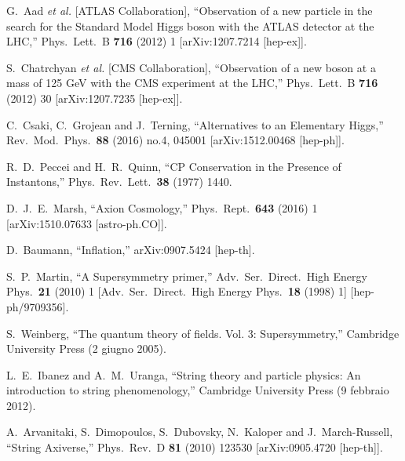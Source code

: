 \documentclass[11pt,a4paper]{article}
\begin{document}
\begin{thebibliography}{99}

  G.~Aad {\it et al.} [ATLAS Collaboration],
  ``Observation of a new particle in the search for the Standard Model Higgs boson with the ATLAS detector at the LHC,''
  Phys.\ Lett.\ B {\bf 716} (2012) 1
  [arXiv:1207.7214 [hep-ex]].
  
  S.~Chatrchyan {\it et al.} [CMS Collaboration],
  ``Observation of a new boson at a mass of 125 GeV with the CMS experiment at the LHC,''
  Phys.\ Lett.\ B {\bf 716} (2012) 30
  [arXiv:1207.7235 [hep-ex]].

  C.~Csaki, C.~Grojean and J.~Terning,
  ``Alternatives to an Elementary Higgs,''
  Rev.\ Mod.\ Phys.\  {\bf 88} (2016) no.4,  045001
  [arXiv:1512.00468 [hep-ph]].

  R.~D.~Peccei and H.~R.~Quinn,
  ``CP Conservation in the Presence of Instantons,''
  Phys.\ Rev.\ Lett.\  {\bf 38} (1977) 1440.
  
  D.~J.~E.~Marsh,
  ``Axion Cosmology,''
  Phys.\ Rept.\  {\bf 643} (2016) 1
  [arXiv:1510.07633 [astro-ph.CO]].

  D.~Baumann,
  ``Inflation,''
  arXiv:0907.5424 [hep-th].
  
  S.~P.~Martin,
  ``A Supersymmetry primer,''
  Adv.\ Ser.\ Direct.\ High Energy Phys.\  {\bf 21} (2010) 1
   [Adv.\ Ser.\ Direct.\ High Energy Phys.\  {\bf 18} (1998) 1]
  [hep-ph/9709356].
  
  S.~Weinberg,
  ``The quantum theory of fields. Vol. 3: Supersymmetry,''
  Cambridge University Press (2 giugno 2005).
  
  L.~E.~Ibanez and A.~M.~Uranga,
  ``String theory and particle physics: An introduction to string phenomenology,''
  Cambridge University Press (9 febbraio 2012).

  A.~Arvanitaki, S.~Dimopoulos, S.~Dubovsky, N.~Kaloper and J.~March-Russell,
  ``String Axiverse,''
  Phys.\ Rev.\ D {\bf 81} (2010) 123530
  [arXiv:0905.4720 [hep-th]].
  

\end{thebibliography}
\end{document}

